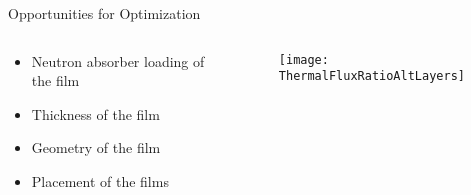 \begin{frame}{Opportunities for Optimization}
  \begin{columns}[onlytextwidth]
    \begin{column}{0.45\textwidth}
    \begin{itemize}
      \item Neutron absorber loading of the film
      \item Thickness of the film
      \item Geometry of the film
      \item Placement of the films
    \end{itemize}
    \end{column}
    \begin{column}{0.45\textwidth}
      \begin{figure}
        \texttt{[image: ThermalFluxRatioAltLayers]}
      \end{figure}
    \end{column}
  \end{columns}
\end{frame}
